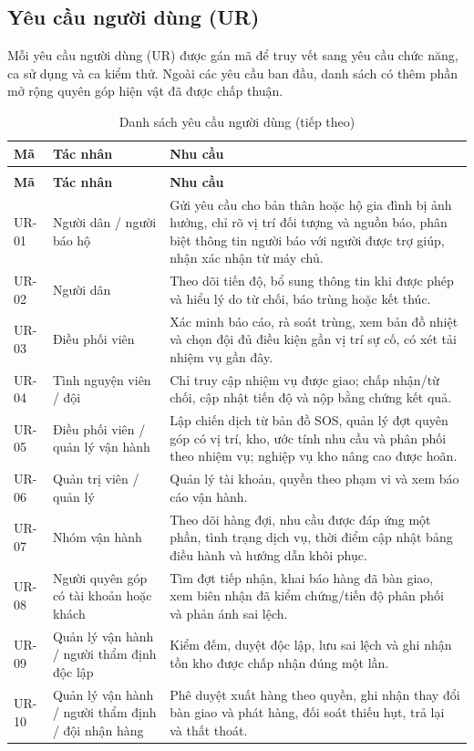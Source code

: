 \documentclass[12pt,a4paper,oneside]{report}
\begin{document}
\subsection{Yêu cầu người dùng (UR)}
Mỗi yêu cầu người dùng (UR) được gán mã để truy vết sang yêu cầu chức năng, ca sử dụng và ca kiểm thử. Ngoài các yêu cầu ban đầu, danh sách có thêm phần mở rộng quyên góp hiện vật đã được chấp thuận.
\small
\begin{longtable}{|L{1.4cm}|L{3.2cm}|L{10.0cm}|}
  \caption{Danh sách yêu cầu người dùng}\label{tab:ur}\\
  \hline
  \centering\textbf{Mã} & \centering\textbf{Tác nhân} & \centering\arraybackslash\textbf{Nhu cầu} \\
  \hline
  \endfirsthead
  \caption[]{Danh sách yêu cầu người dùng (tiếp theo)}\\
  \hline
  \centering\textbf{Mã} & \centering\textbf{Tác nhân} & \centering\arraybackslash\textbf{Nhu cầu} \\
  \hline
  \endhead
  UR-01 & Người dân / người báo hộ & Gửi yêu cầu cho bản thân hoặc hộ gia đình bị ảnh hưởng, chỉ rõ vị trí đối tượng và nguồn báo, phân biệt thông tin người báo với người được trợ giúp, nhận xác nhận từ máy chủ. \\
  \hline
  UR-02 & Người dân & Theo dõi tiến độ, bổ sung thông tin khi được phép và hiểu lý do từ chối, báo trùng hoặc kết thúc. \\
  \hline
  UR-03 & Điều phối viên & Xác minh báo cáo, rà soát trùng, xem bản đồ nhiệt và chọn đội đủ điều kiện gần vị trí sự cố, có xét tải nhiệm vụ gần đây. \\
  \hline
  UR-04 & Tình nguyện viên / đội & Chỉ truy cập nhiệm vụ được giao; chấp nhận/từ chối, cập nhật tiến độ và nộp bằng chứng kết quả. \\
  \hline
  UR-05 & Điều phối viên / quản lý vận hành & Lập chiến dịch từ bản đồ SOS, quản lý đợt quyên góp có vị trí, kho, ước tính nhu cầu và phân phối theo nhiệm vụ; nghiệp vụ kho nâng cao được hoãn. \\
  \hline
  UR-06 & Quản trị viên / quản lý & Quản lý tài khoản, quyền theo phạm vi và xem báo cáo vận hành. \\
  \hline
  UR-07 & Nhóm vận hành & Theo dõi hàng đợi, nhu cầu được đáp ứng một phần, tình trạng dịch vụ, thời điểm cập nhật bảng điều hành và hướng dẫn khôi phục. \\
  \hline
  UR-08 & Người quyên góp có tài khoản hoặc khách & Tìm đợt tiếp nhận, khai báo hàng đã bàn giao, xem biên nhận đã kiểm chứng/tiến độ phân phối và phản ánh sai lệch. \\
  \hline
  UR-09 & Quản lý vận hành / người thẩm định độc lập & Kiểm đếm, duyệt độc lập, lưu sai lệch và ghi nhận tồn kho được chấp nhận đúng một lần. \\
  \hline
  UR-10 & Quản lý vận hành / người thẩm định / đội nhận hàng & Phê duyệt xuất hàng theo quyền, ghi nhận thay đổi bàn giao và phát hàng, đối soát thiếu hụt, trả lại và thất thoát. \\
  \hline
\end{longtable}
\normalsize
\end{document}
